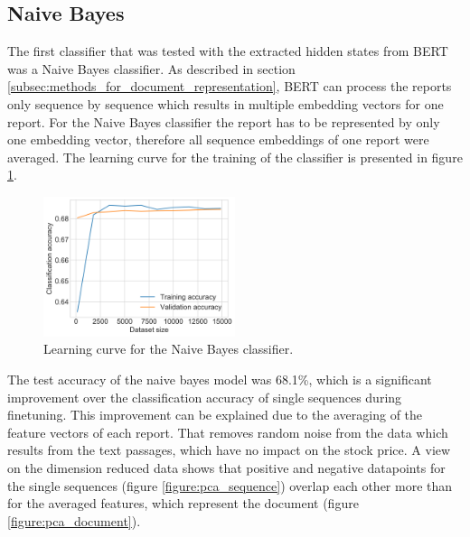 \subsection{Naive Bayes}
\label{subsec:nb_results}
The first classifier that was tested with the extracted hidden states from \ac{BERT} was a Naive Bayes classifier.
As described in section \ref{subsec:methods_for_document_representation}, \ac{BERT} can process the reports only sequence by sequence which results in multiple embedding vectors for one report.
For the Naive Bayes classifier the report has to be represented by only one embedding vector, therefore all sequence embeddings of one report were averaged.
The learning curve for the training of the classifier is presented in figure \ref{figure:nb_learning}.
\begin{figure}[h]
    \centering
    \includegraphics[width=0.5\textwidth]{figures/charts/nb_learning.png}
    \caption{Learning curve for the Naive Bayes classifier.}
    \label{figure:nb_learning}
\end{figure}
The test accuracy of the naive bayes model was 68.1\%, which is a significant improvement over the classification accuracy of single sequences during finetuning.
This improvement can be explained due to the averaging of the feature vectors of each report.
That removes random noise from the data which results from the text passages, which have no impact on the stock price.
A view on the dimension reduced data shows that positive and negative datapoints for the single sequences (figure \ref{figure:pca_sequence}) overlap each other more than for the averaged features, which represent the document (figure \ref{figure:pca_document}).
